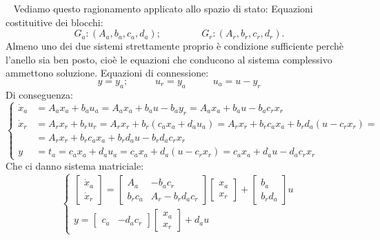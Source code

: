 \ \newline
Vediamo questo ragionamento applicato allo spazio di stato:\newline
Equazioni costituitive dei blocchi:
\[
    G_a : (A_a, b_a, c_a,d_a); \;\;\;\;\;\;\;\;\;\;\;\;\;\;\; G_r : (A_r, b_r,c_r,d_r).
\]
Almeno uno dei due sistemi strettamente proprio è condizione sufficiente perchè l'anello sia ben posto, cioè le equazioni che conducono al sistema complessivo ammettono soluzione.\newline
Equazioni di connessione:
\[
    y = y_a; \;\;\;\;\;\;\;\;\;\; u_r = y_a \;\;\;\;\;\;\;\;\;\; u_a = u - y_r
\]
Di conseguenza:
\[
    \begin{cases}
        \dot{x}_a &= A_a x_a + b_a u_a = A_a x_a + b_a u - b_a y_r = A_a x_a + b_a u - b_a c_r x_r\\
        \dot{x}_r &= A_r x_r + b_r u_r = A_r x_r + b_r(c_ax_a + d_au_a) = A_r x_r + b_rc_ax_a + b_r d_a (u-c_rx_r) =\\
         &= A_r x_r + b_r c_a x_a + b_r d_a u - b_rd_ac_rx_r\\
        y &= t_a = c_ax_a + d_au_a = c_a x_a + d_a(u-c_rx_r) = c_ax_a + d_a u - d_a c_rx_r
    \end{cases}
\]
Che ci danno sistema matriciale:
\[
    \begin{cases}
        \left[\begin{matrix}
            \dot{x}_a\\\dot{x}_r
        \end{matrix}\right] = \left[\begin{matrix}
            A_a & -b_ac_r \\ b_rc_a & A_r-b_rd_ac_r
        \end{matrix}\right] \left[\begin{matrix}
            x_a\\x_r
        \end{matrix}\right] + \left[\begin{matrix}
            b_a \\b_rd_a 
        \end{matrix}\right] u\\
        y = \left[\begin{matrix}
            c_a & -d_ac_r
        \end{matrix}\right] \left[\begin{matrix}
            x_a\\x_r
        \end{matrix}\right] + d_a u
    \end{cases}
\]